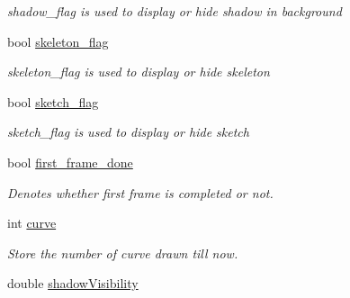 \begin{DoxyCompactItemize}
\begin{DoxyCompactList}\small\item\em shadow\-\_\-flag is used to display or hide shadow in background \end{DoxyCompactList}\item 
\hypertarget{classScribbleArea_a14fd48a52e200dbfdea54729a4e632fd}{bool \hyperlink{classScribbleArea_a14fd48a52e200dbfdea54729a4e632fd}{skeleton\-\_\-flag}}\label{classScribbleArea_a14fd48a52e200dbfdea54729a4e632fd}

\begin{DoxyCompactList}\small\item\em skeleton\-\_\-flag is used to display or hide skeleton \end{DoxyCompactList}\item 
\hypertarget{classScribbleArea_a7883b3c09d0883cb46fc2e68ebbe9812}{bool \hyperlink{classScribbleArea_a7883b3c09d0883cb46fc2e68ebbe9812}{sketch\-\_\-flag}}\label{classScribbleArea_a7883b3c09d0883cb46fc2e68ebbe9812}

\begin{DoxyCompactList}\small\item\em sketch\-\_\-flag is used to display or hide sketch \end{DoxyCompactList}\item 
\hypertarget{classScribbleArea_af8628e06305594a41aeeab1c9ed3cf5b}{bool \hyperlink{classScribbleArea_af8628e06305594a41aeeab1c9ed3cf5b}{first\-\_\-frame\-\_\-done}}\label{classScribbleArea_af8628e06305594a41aeeab1c9ed3cf5b}

\begin{DoxyCompactList}\small\item\em \-Denotes whether first frame is completed or not. \end{DoxyCompactList}\item 
\hypertarget{classScribbleArea_acd422278072e45a1be766206c689ed71}{int \hyperlink{classScribbleArea_acd422278072e45a1be766206c689ed71}{curve}}\label{classScribbleArea_acd422278072e45a1be766206c689ed71}

\begin{DoxyCompactList}\small\item\em \-Store the number of curve drawn till now. \end{DoxyCompactList}\item 
\hypertarget{classScribbleArea_a1e9227bf72b1fc83cc96d63e7e6b425d}{double \hyperlink{classScribbleArea_a1e9227bf72b1fc83cc96d63e7e6b425d}{shadow\-Visibility}}\label{classScribbleArea_a1e9227bf72b1fc83cc96d63e7e6b425d}


\end{DoxyCompactItemize}
